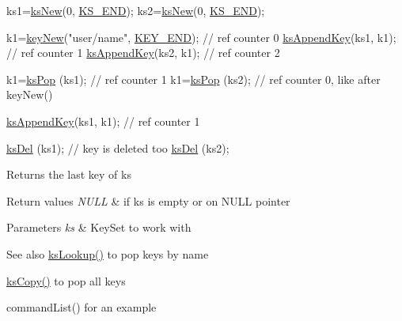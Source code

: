 \begin{DoxyCode}
ks1=\hyperlink{group__keyset_ga671e1aaee3ae9dc13b4834a4ddbd2c3c}{ksNew}(0, \hyperlink{group__keyset_ga7a28fce3773b2c873c94ac80b8b4cd54}{KS\_END});
ks2=\hyperlink{group__keyset_ga671e1aaee3ae9dc13b4834a4ddbd2c3c}{ksNew}(0, \hyperlink{group__keyset_ga7a28fce3773b2c873c94ac80b8b4cd54}{KS\_END});

k1=\hyperlink{group__key_gad23c65b44bf48d773759e1f9a4d43b89}{keyNew}(\textcolor{stringliteral}{"user/name"}, \hyperlink{group__key_gga9b703ca49f48b482def322b77d3e6bc8aa8adb6fcb92dec58fb19410eacfdd403}{KEY\_END}); \textcolor{comment}{// ref counter 0}
\hyperlink{group__keyset_gaa5a1d467a4d71041edce68ea7748ce45}{ksAppendKey}(ks1, k1); \textcolor{comment}{// ref counter 1}
\hyperlink{group__keyset_gaa5a1d467a4d71041edce68ea7748ce45}{ksAppendKey}(ks2, k1); \textcolor{comment}{// ref counter 2}

k1=\hyperlink{group__keyset_gae42530b04defb772059de0600159cf69}{ksPop} (ks1); \textcolor{comment}{// ref counter 1}
k1=\hyperlink{group__keyset_gae42530b04defb772059de0600159cf69}{ksPop} (ks2); \textcolor{comment}{// ref counter 0, like after keyNew()}

\hyperlink{group__keyset_gaa5a1d467a4d71041edce68ea7748ce45}{ksAppendKey}(ks1, k1); \textcolor{comment}{// ref counter 1}

\hyperlink{group__keyset_ga27e5c16473b02a422238c8d970db7ac8}{ksDel} (ks1); \textcolor{comment}{// key is deleted too}
\hyperlink{group__keyset_ga27e5c16473b02a422238c8d970db7ac8}{ksDel} (ks2);
\end{DoxyCode}


\begin{DoxyReturn}{Returns}
the last key of {\ttfamily ks} 
\end{DoxyReturn}

\begin{DoxyRetVals}{Return values}
{\em N\+U\+LL} & if {\ttfamily ks} is empty or on N\+U\+LL pointer \\
\hline
\end{DoxyRetVals}

\begin{DoxyParams}{Parameters}
{\em ks} & Key\+Set to work with \\
\hline
\end{DoxyParams}
\begin{DoxySeeAlso}{See also}
\hyperlink{group__keyset_ga60f1ddcf23272f2b29b90e92ebe9b56f}{ks\+Lookup()} to pop keys by name 

\hyperlink{group__keyset_gaba1f1dbea191f4d7e7eb3e4296ae7d5e}{ks\+Copy()} to pop all keys 

command\+List() for an example 
\end{DoxySeeAlso}
\mbox{\label{group__keyset_gabe793ff51f1728e3429c84a8a9086b70}} 
